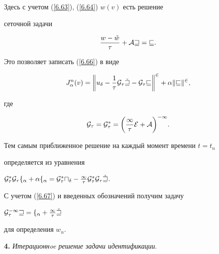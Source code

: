 Здесь с учетом (\ref{6.63}), (\ref{6.64}) $w(v)$ есть решение


сеточной задачи


\begin{equation}\label{6.67}


\frac{w - \check{w}}{\tau} + \cal{A} w = v .


\end{equation}


Это позволяет записать (\ref{6.66}) в виде


$$


J_{\alpha}^n (v) =


\bigg \|u_{\delta} - \frac{1}{\tau} \cal{G}_{\tau}\check{w} -


\cal{G}_{\tau}v \bigg \|^2 + \alpha \|v\|^2 ,


$$


где


$$


\cal{G}_{\tau} = \cal{G}_{\tau}^* = \bigg (\frac{1}{\tau} E +


\cal{A} \bigg)^{-1} .


$$


Тем самым приближенное решение на каждый момент времени $t = t_n$


определяется из уравнения




$\cal{G}_{\tau}^* \cal{G}_{\tau} f_{\alpha} +


\alpha f_{\alpha} = \cal{G}_{\tau}^* u_{\delta} - \frac{1}{\tau}


\cal{G}_{\tau}^* \cal{G}_{\tau}\check{w}$.




С учетом (\ref{6.67}) и введенных обозначений получим задачу




$\cal{G}_{\tau}^{-1} w = f_{\alpha} + \frac{1}{\tau}


\check{w}$




для определения $w_n$.


\medskip





{\bf 4.} {\it Итерационнoe решение задачи идентификации}.


